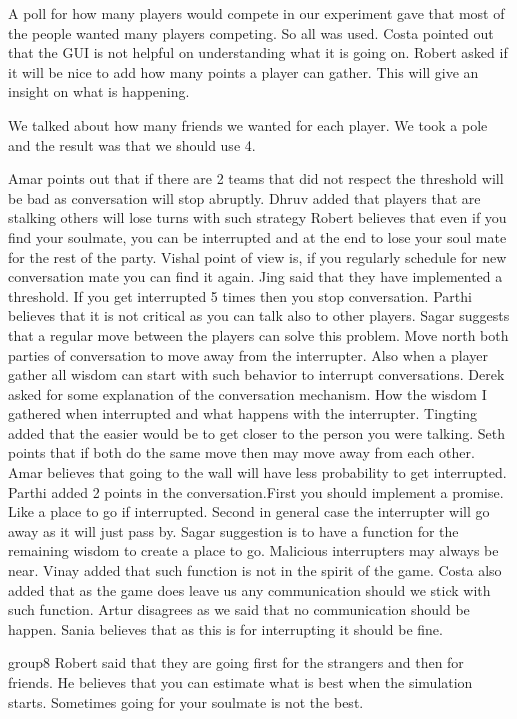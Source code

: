 A poll for how many players would compete in our experiment gave that most of the people wanted many players competing. So all was used.
Costa pointed out that the GUI is not helpful on understanding what it is going on.
Robert asked if it will be nice to add how many points a player can gather. This will give an insight on what is happening.

We talked about how many friends we wanted for each player.
We took a pole and the result was that we should use 4.

Amar points out that if there are 2 teams that did not respect the threshold will be bad as conversation will stop abruptly.
Dhruv added that players that are stalking others will lose turns with such strategy
Robert believes that even if you find your soulmate, you can be interrupted and at the end to lose your soul mate for the rest of the party.
Vishal point of view is, if you regularly schedule for new conversation mate you can find it again.
Jing said that they have implemented a threshold. If you get interrupted 5 times then you stop conversation.
Parthi believes that it is not critical as you can talk also to other players.
Sagar suggests that a regular move between the players can solve this problem. 
Move north both parties of conversation to move away from the interrupter. Also 
when a player gather all wisdom can start with such behavior to interrupt conversations.
Derek asked for some explanation of the conversation mechanism. How the wisdom I gathered when interrupted and what happens with the interrupter. 
Tingting added that the easier would be to get closer to the person you were talking.
Seth points that if both do the same move then may move away from each other.
Amar believes that going to the wall will have less probability to get interrupted.
Parthi added 2 points in the conversation.First you should implement a promise. Like a place to go if interrupted. Second in general case the interrupter will go away as it will just pass by.
Sagar suggestion is to have a function for the remaining wisdom to create a place to go. Malicious interrupters may always be near. 
Vinay added that such function is not in the spirit of the game.
Costa also added that as the game does leave us any communication should we stick with such function.
Artur disagrees as we said that no communication should be happen.
Sania believes that as this is for interrupting it should be fine.

group8
Robert said that they are going first for the strangers and then for friends. He believes that you can estimate what is best when the simulation starts. Sometimes going for your soulmate is not the best.

